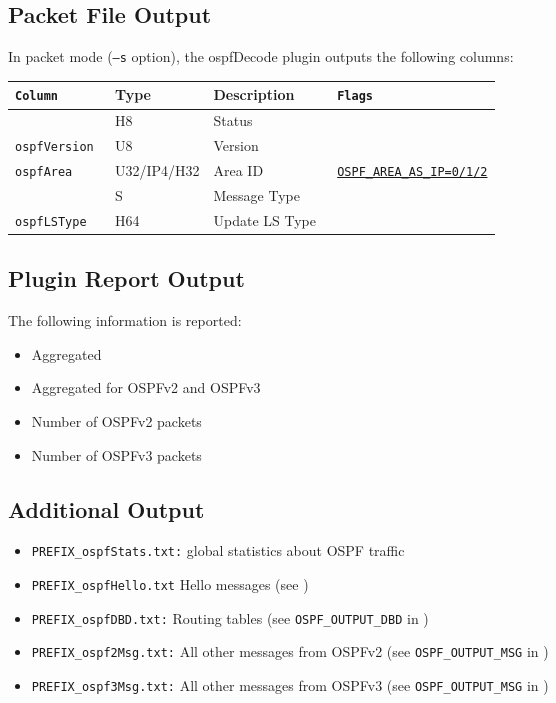 \documentclass[documentation]{subfiles}
\begin{document}
\subsection{Packet File Output}
In packet mode ({\tt --s} option), the ospfDecode plugin outputs the following columns:
\begin{longtable}{>{\tt}lll>{\tt\small}l}
    \toprule
    {\bf Column}       & {\bf Type}  & {\bf Description} & {\bf Flags}\\
    \midrule\endhead%
    \nameref{ospfStat} & H8          & Status            & \\
    ospfVersion        & U8          & Version           & \\
    ospfArea           & U32/IP4/H32 & Area ID           & \hyperref[s:ospf-of]{OSPF\_AREA\_AS\_IP=0/1/2}\\
    \nameref{ospfType} & S           & Message Type      & \\
    ospfLSType         & H64         & Update LS Type    & \\
    \bottomrule
\end{longtable}

\subsection{Plugin Report Output}
The following information is reported:
\begin{itemize}
    \item Aggregated {\tt{}}
    \item Aggregated {\tt{}} for OSPFv2 and OSPFv3
    \item Number of OSPFv2 packets
    \item Number of OSPFv3 packets
\end{itemize}

\subsection{Additional Output}
\begin{itemize}
    \item {\tt PREFIX\_ospfStats.txt:} global statistics about OSPF traffic
    \item {\tt PREFIX\_ospfHello.txt}  Hello messages (see )
    \item {\tt PREFIX\_ospfDBD.txt:}   Routing tables (see {\tt OSPF\_OUTPUT\_DBD} in )
    \item {\tt PREFIX\_ospf2Msg.txt:}  All other messages from OSPFv2 (see {\tt OSPF\_OUTPUT\_MSG} in )
    \item {\tt PREFIX\_ospf3Msg.txt:}  All other messages from OSPFv3 (see {\tt OSPF\_OUTPUT\_MSG} in )
\end{itemize}
\end{document}
